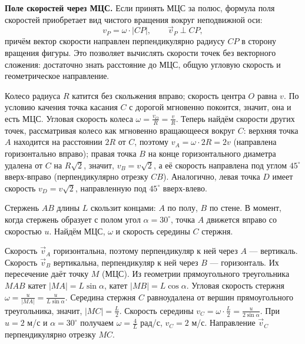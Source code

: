 \documentclass[../main.tex]{subfiles}
\begin{document}
\noindent\textbf{Поле скоростей через МЦС.}
Если принять МЦС за полюс, формула поля скоростей приобретает вид чистого
вращения вокруг неподвижной оси:
\[
v_P = \omega \cdot |CP|, \qquad \vec{v}_P \perp CP,
\]
причём вектор скорости направлен перпендикулярно радиусу $CP$ в сторону
вращения фигуры. Это позволяет вычислять скорости точек без векторного
сложения: достаточно знать расстояние до МЦС, общую угловую скорость
и геометрическое направление.

\begin{example}
Колесо радиуса $R$ катится без скольжения вправо; скорость центра $O$
равна $v$. По условию качения точка касания $C$ с дорогой мгновенно
покоится, значит, она и есть МЦС. Угловая скорость колеса
$\omega = \frac{v_O}{R} = \frac{v}{R}$. Теперь найдём скорости других точек,
рассматривая колесо как мгновенно вращающееся вокруг $C$:
верхняя точка $A$ находится на расстоянии $2R$ от $C$, поэтому
$v_A = \omega \cdot 2R = 2v$ (направлена горизонтально вправо);
правая точка $B$ на конце горизонтального диаметра удалена от $C$
на $R\sqrt{2}$, значит, $v_B = v\sqrt{2}$, а её скорость направлена
под углом $45^\circ$ вверх-вправо (перпендикулярно отрезку $CB$).
Аналогично, левая точка $D$ имеет скорость $v_D = v\sqrt{2}$,
направленную под $45^\circ$ вверх-влево.
\end{example}

\begin{example}
Стержень $AB$ длины $L$ скользит концами: $A$ по полу, $B$ по стене.
В момент, когда стержень образует с полом угол $\alpha = 30^\circ$,
точка $A$ движется вправо со скоростью $u$. Найдём МЦС, $\omega$
и скорость середины $C$ стержня.

Скорость $\vec{v}_A$ горизонтальна, поэтому перпендикуляр к ней через $A$ ---
вертикаль. Скорость $\vec{v}_B$ вертикальна, перпендикуляр к ней через $B$ ---
горизонталь. Их пересечение даёт точку $M$ (МЦС). Из геометрии
прямоугольного треугольника $MAB$ катет $|MA| = L\sin\alpha$,
катет $|MB| = L\cos\alpha$. Угловая скорость стержня
$\omega = \frac{u}{|MA|} = \frac{u}{L\sin\alpha}$.
Середина стержня $C$ равноудалена от вершин прямоугольного треугольника,
значит, $|MC| = \frac{L}{2}$. Скорость середины
$v_C = \omega \cdot \frac{L}{2} = \frac{u}{2\sin\alpha}$.
При $u = 2$ м/с и $\alpha = 30^\circ$ получаем $\omega = \frac{4}{L}$ рад/с,
$v_C = 2$ м/с. Направление $\vec{v}_C$ перпендикулярно отрезку $MC$.
\end{example}
\end{document}
